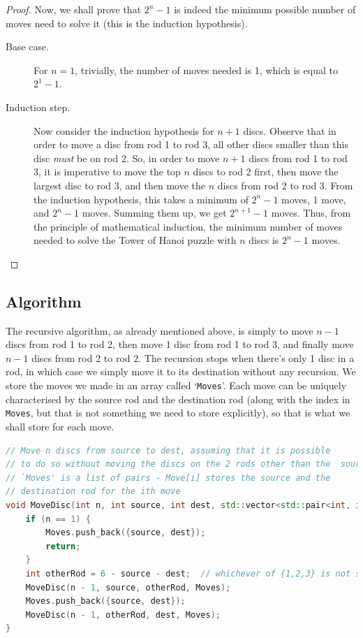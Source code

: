\documentclass[12pt, a4paper]{article}
\theoremstyle{definition}
\theoremstyle{remark}
\begin{document}
\begin{proof}
    Now, we shall prove that $2^n - 1$ is indeed the minimum possible number of moves need to solve it (this is the induction hypothesis).
    \begin{description}
        \item[Base case.] For $n=1$, trivially, the number of moves needed is 1, which is equal to $2^1 - 1$.
        \item[Induction step.] Now consider the induction hypothesis for $n+1$ discs. Observe that in order to move a disc from rod 1 to rod 3, all other discs smaller than this disc \textit{must} be on rod 2. So, in order to move $n+1$ discs from rod 1 to rod 3, it is imperative to move the top $n$ discs to rod 2 first, then move the largest disc to rod 3, and then move the $n$ discs from rod 2 to rod 3. From the induction hypothesis, this takes a minimum of $2^n-1$ moves, 1 move, and $2^n - 1$ moves. Summing them up, we get $2^{n+1}-1$ moves. Thus, from the principle of mathematical induction, the minimum number of moves needed to solve the Tower of Hanoi puzzle with $n$ discs is $2^n - 1$ moves.
    \end{description}
\end{proof}

\subsection{Algorithm}
The recursive algorithm, as already mentioned above, is simply to move $n-1$ discs from rod 1 to rod 2, then move 1 disc from rod 1 to rod 3, and finally move $n-1$ discs from rod 2 to rod 2. The recursion stops when there's only 1 disc in a rod, in which case we simply move it to its destination without any recursion. We store the moves we made in an array called `\texttt{Moves}'. Each move can be uniquely characterised by the source rod and the destination rod (along with the index in \texttt{Moves}, but that is not something we need to store explicitly), so that is what we shall store for each move.

\begin{lstlisting}[language=C++]
// Move n discs from source to dest, assuming that it is possible
// to do so without moving the discs on the 2 rods other than the  source rod.
// `Moves' is a list of pairs - Move[i] stores the source and the
// destination rod for the ith move
void MoveDisc(int n, int source, int dest, std::vector<std::pair<int, int>>& Moves) {
    if (n == 1) {
        Moves.push_back({source, dest});
        return;
    }
    int otherRod = 6 - source - dest;  // whichever of {1,2,3} is not source or dest
    MoveDisc(n - 1, source, otherRod, Moves);
    Moves.push_back({source, dest});
    MoveDisc(n - 1, otherRod, dest, Moves);
}
\end{lstlisting}
\end{document}
